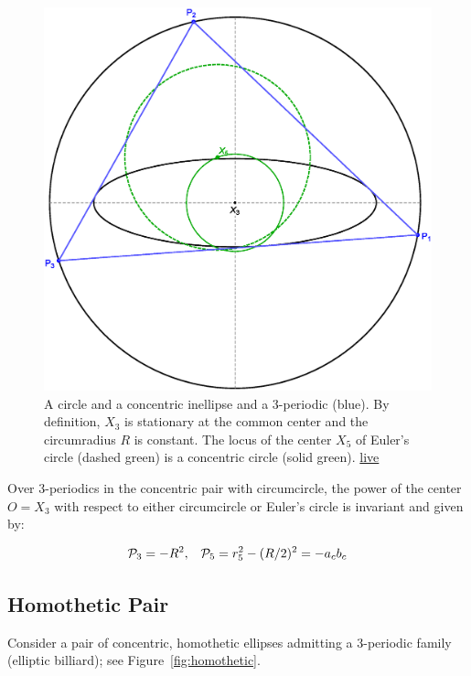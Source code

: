 \begin{figure}
    \centering
    \includegraphics[width=.5\textwidth]{pics/0060_n3_circumcircle.eps}
    \caption{A circle and a concentric inellipse and a  3-periodic (blue). By definition, $X_3$ is stationary at the common center and the circumradius $R$ is constant. The locus of the center $X_5$ of Euler's circle (dashed green) is a concentric circle (solid green). \href{https://bit.ly/31nIg84}{live}}
    \label{fig:circumcircle}
\end{figure}

\begin{corollary}
Over 3-periodics in the concentric pair with circumcircle, the power of the center $O=X_3$ with respect to either circumcircle or Euler's circle is invariant and given by:

\[ \P_3 = -R^2,\;\;\;\P_5 = r_5^2-(R/2)^2 = -a_c b_c\]
\end{corollary}


\subsection{Homothetic Pair}

Consider a pair of concentric, homothetic ellipses admitting a 3-periodic family (elliptic billiard); see Figure~\ref{fig:homothetic}.


